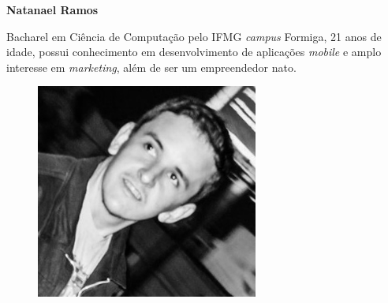 		\begin{minipage}{0.6\textwidth}
			
			\textbf{Natanael Ramos}
				
			Bacharel em Ciência de Computação pelo IFMG \textit{campus} Formiga, 21 anos de idade, possui conhecimento em desenvolvimento de aplicações \textit{mobile} e amplo interesse em \textit{marketing}, além de ser um empreendedor nato.
				
			
		\end{minipage}
		\begin{minipage}{0.4\textwidth}
			
			\begin{figure}[H]
				\centering
				\includegraphics[width=0.65\textwidth]{img/noelpb.jpg}
			\end{figure}
			
		\end{minipage}
		
		
		
